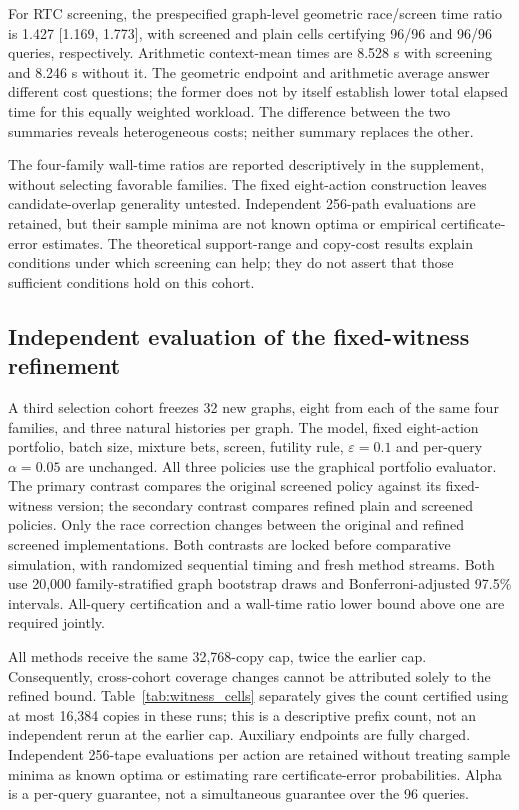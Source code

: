 \documentclass[preprint,11pt,sort&compress]{elsarticle}
\begin{document}
For RTC screening, the prespecified graph-level geometric race/screen time ratio is 1.427 [1.169, 1.773], with screened and plain cells certifying 96/96 and 96/96 queries, respectively. Arithmetic context-mean times are 8.528 s with screening and 8.246 s without it. The geometric endpoint and arithmetic average answer different cost questions; the former does not by itself establish lower total elapsed time for this equally weighted workload. The difference between the two summaries reveals heterogeneous costs; neither summary replaces the other.

The four-family wall-time ratios are reported descriptively in the supplement, without selecting favorable families. The fixed eight-action construction leaves candidate-overlap generality untested. Independent 256-path evaluations are retained, but their sample minima are not known optima or empirical certificate-error estimates. The theoretical support-range and copy-cost results explain conditions under which screening can help; they do not assert that those sufficient conditions hold on this cohort.

\subsection{Independent evaluation of the fixed-witness refinement}
\label{sec:witness_study}
A third selection cohort freezes 32 new graphs, eight from each of the same
four families, and three natural histories per graph. The model, fixed
eight-action portfolio, batch size, mixture bets, screen, futility rule,
$\varepsilon=0.1$ and per-query $\alpha=0.05$ are unchanged.
All three policies use the graphical portfolio evaluator.
The primary contrast compares the original screened policy against its
fixed-witness version; the secondary contrast compares refined plain and
screened policies. Only the race correction changes between the original
and refined screened implementations. Both contrasts are locked before
comparative simulation, with randomized sequential timing and fresh method
streams. Both use 20,000 family-stratified graph bootstrap draws and
Bonferroni-adjusted 97.5\% intervals. All-query certification and a wall-time
ratio lower bound above one are required jointly.

All methods receive the same 32,768-copy cap, twice the earlier cap.
Consequently, cross-cohort coverage changes cannot be attributed solely to
the refined bound. Table~\ref{tab:witness_cells} separately gives the count
certified using at most 16,384 copies in these runs; this is a descriptive
prefix count, not an independent rerun at the earlier cap. Auxiliary
endpoints are fully charged. Independent 256-tape evaluations per action
are retained without treating sample minima as known optima or estimating
rare certificate-error probabilities. Alpha is a per-query guarantee, not
a simultaneous guarantee over the 96 queries.
\end{document}
